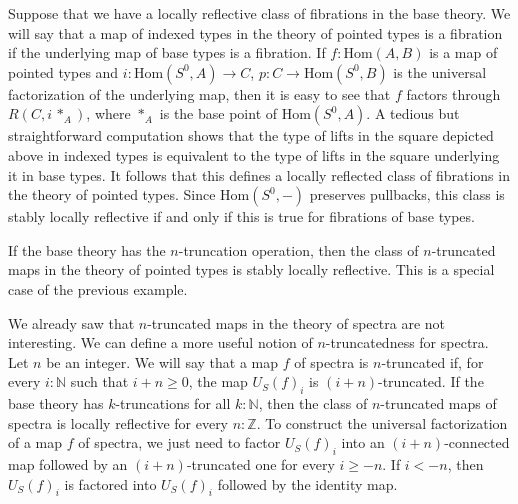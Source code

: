 \documentclass[reqno]{mscs}
\newcommand{\fs}[1]{\mathrm{#1}}
\newcommand{\Hom}{\fs{Hom}}
\numberwithin{figure}{section}
\begin{document}
\begin{example}
Suppose that we have a locally reflective class of fibrations in the base theory.
We will say that a map of indexed types in the theory of pointed types is a fibration if the underlying map of base types is a fibration.
If $f : \Hom(A,B)$ is a map of pointed types and $i : \Hom(S^0,A) \to C$, $p : C \to \Hom(S^0,B)$ is the universal factorization of the underlying map,
then it is easy to see that $f$ factors through $R(C, i\,*_A)$, where $*_A$ is the base point of $\Hom(S^0,A)$.
A tedious but straightforward computation shows that the type of lifts in the square depicted above in indexed types is equivalent to the type of lifts in the square underlying it in base types.
It follows that this defines a locally reflected class of fibrations in the theory of pointed types.
Since $\Hom(S^0,-)$ preserves pullbacks, this class is stably locally reflective if and only if this is true for fibrations of base types.
\end{example}

\begin{example}
If the base theory has the $n$-truncation operation, then the class of $n$-truncated maps in the theory of pointed types is stably locally reflective.
This is a special case of the previous example.
\end{example}

\begin{example}
We already saw that $n$-truncated maps in the theory of spectra are not interesting.
We can define a more useful notion of $n$-truncatedness for spectra.
Let $n$ be an integer.
We will say that a map $f$ of spectra is $n$-truncated if, for every $i : \mathbb{N}$ such that $i + n \geq 0$, the map $U_S(f)_i$ is $(i + n)$-truncated.
If the base theory has $k$-truncations for all $k : \mathbb{N}$, then the class of $n$-truncated maps of spectra is locally reflective for every $n : \mathbb{Z}$.
To construct the universal factorization of a map $f$ of spectra, we just need to factor $U_S(f)_i$ into an $(i+n)$-connected map followed by an $(i+n)$-truncated one for every $i \geq -n$.
If $i < -n$, then $U_S(f)_i$ is factored into $U_S(f)_i$ followed by the identity map.
\end{example}
\end{document}
